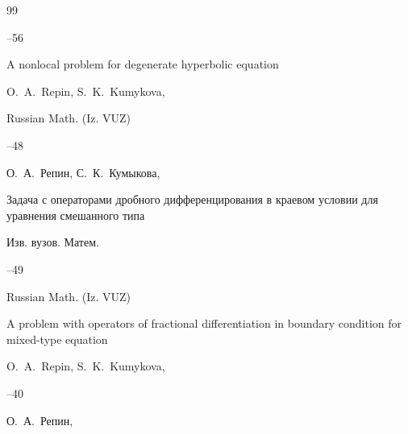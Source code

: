 \begin{thebibliography}{99}


--56


\transl

\paper A nonlocal problem for degenerate hyperbolic equation 	

\by O.~A.~Repin, S.~K.~Kumykova,  	


\jour Russian Math. (Iz. VUZ)



--48 





\by О.~А.~Репин, С.~К.~Кумыкова,

\paper Задача с операторами дробного дифференцирования в краевом условии для уравнения смешанного типа

\jour Изв. вузов. Матем.



--49


\transl

\jour Russian Math. (Iz. VUZ)

\paper A problem with operators of fractional differentiation in boundary condition for mixed-type equation

\by   O.~A.~Repin, S.~K.~Kumykova,




--40









\by О.~А.~Репин,


\end{thebibliography}
